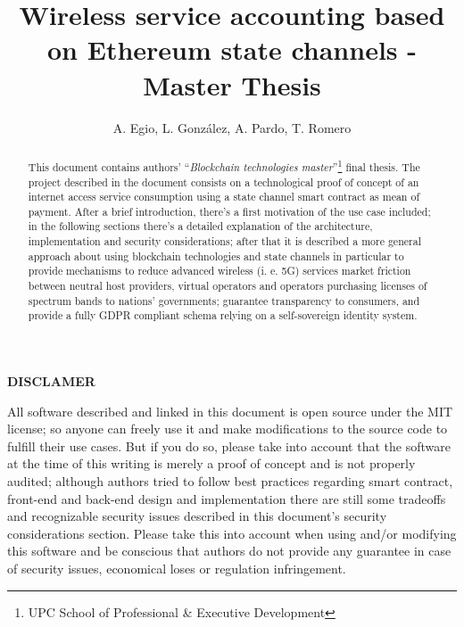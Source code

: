 \documentclass[12pt]{amsart}
\title{Wireless service accounting based on Ethereum state channels
- Master Thesis}
\author{
  A. Egio,
  L. González, A. Pardo, T. Romero
}
\begin{document}
\pagecolor{pagecolor}


\begin{abstract}
  \begin{center}
    This document contains authors' ``\textit{Blockchain
      technologies master}''\footnote{UPC School
      of Professional \& Executive Development}
    final thesis. The project described in the document
    consists on a technological proof
    of concept of an internet access service consumption
    using a state channel smart contract as
    mean of payment. After a brief
    introduction, there's a first motivation of
    the use case included;
    in the following sections
    there's a detailed explanation of
    the architecture, implementation and
    security considerations;
    after that it is described a more
    general approach about using blockchain technologies
    and state channels in particular to provide
    mechanisms to reduce advanced wireless
    (i. e. 5G) services market friction between neutral host
    providers, virtual operators and operators
    purchasing licenses of spectrum bands to nations' governments;
    guarantee transparency to consumers,
    and provide a fully GDPR compliant
    schema relying on a self-sovereign identity system.
  \end{center}
\end{abstract}

\maketitle

\tableofcontents

\newpage

\vspace*{5cm}

\begin{center}
\Huge{\textbf{DISCLAMER}}
\vspace{1cm}


\Large
All software described and linked in this document is open source
under the MIT license; so anyone can freely use it and make
modifications to the source code to fulfill their use
cases. But if you do so, please take into account that the software
at the time of this writing is merely
a proof of concept and is not properly audited; although
authors tried to follow best practices regarding smart contract,
front-end and back-end design and implementation there are still
some tradeoffs and recognizable security issues
described in this document's
security considerations section. Please take this into account
when using and/or modifying this software and be conscious
that authors do not provide any guarantee in case of
security issues, economical loses or regulation infringement.
\end{center}
\end{document}
